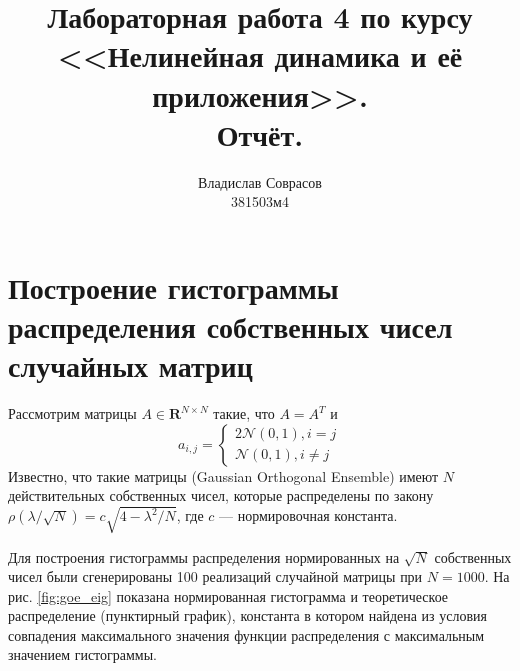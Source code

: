 \documentclass[a4paper]{article}
\begin{document}
\title{Лабораторная работа 4 по курсу <<Нелинейная динамика и её приложения>>. \\Отчёт.}
\author{Владислав Соврасов\\ 381503м4}
\date{}
\maketitle

\section{Построение гистограммы распределения собственных чисел случайных матриц}
Рассмотрим матрицы \(A\in \mathbf{R}^{N\times N}\) такие, что \(A=A^T\) и
\begin{displaymath}
	a_{i,j} = \left\{
  \begin{array}{lr}
    2\mathcal{N}(0,1), i=j\\
		\mathcal{N}(0,1), i	\neq j
  \end{array}
\right.
\end{displaymath}
Известно, что такие матрицы (Gaussian Orthogonal Ensemble) имеют \(N\) действительных собственных чисел, которые
распределены по закону \(\rho(\lambda / \sqrt{N})=c \sqrt{4-\lambda^2/N}\), где
\(c\) --- нормировочная константа.

Для построения гистограммы распределения нормированных на \(\sqrt{N}\) собственных чисел были
сгенерированы 100 реализаций случайной матрицы при \(N=1000\). На рис. \ref{fig:goe_eig}
показана нормированная гистограмма и теоретическое распределение (пунктирный график), константа
в котором найдена из условия совпадения максимального значения функции распределения
с максимальным значением гистограммы.
\end{document}
